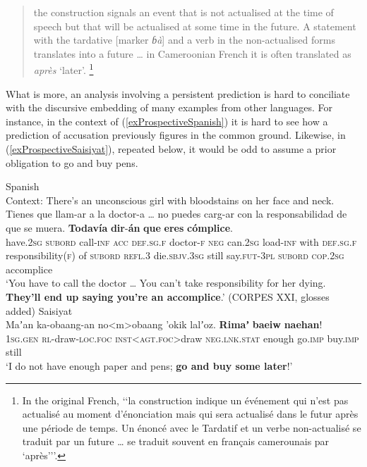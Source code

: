 \begin{quote}
the construction signals an event that is not actualised at the time of speech but that will be actualised at some time in the future. A statement with the tardative {[}marker \textit{ɓà}{]} and a verb in the non-actualised forms translates into a future … in Cameroonian French it is often translated as \textit{après} \lq later\rq{}. \parencite[382]{Elders2000}\footnote{In the original French, \lq\lq{}la construction indique un événement qui n’est pas actualisé au moment d’énonciation mais qui sera actualisé dans le futur après une période de temps. Un énoncé avec le Tardatif et un verbe non-actualisé se traduit par un future … se traduit souvent en français camerounais par \lq{}après\rq{}{\rq\rq}.}
\end{quote}

What is more, an analysis involving a persistent prediction is hard to conciliate with the discursive embedding of many examples from other languages. For instance, in the context of (\ref{exProspectiveSpanish}) it is hard to see how a prediction of accusation previously figures in the common ground. Likewise, in (\ref{exProspectiveSaisiyat}), repeated below, it would be odd to assume a prior obligation to go and buy pens.

\begin{exe}
	\ex Spanish\label{exProspectiveSpanish}\\
	 Context: There's an unconscious girl with bloodstains on her face and neck.\\
	 \gll Tienes que llam-ar a la doctor-a … no puedes carg-ar con la responsabilidad de que se muera. \textbf{Todavía} \textbf{dir}-\textbf{án} \textbf{que} \textbf{eres} \textbf{cómplice}.\\
	have.2\textsc{sg} \textsc{subord} call-\textsc{inf} \textsc{acc} \textsc{def}.\textsc{sg}.\textsc{f} doctor-\textsc{f} {}
	\textsc{neg} can.2\textsc{sg} load-\textsc{inf} with \textsc{def}.\textsc{sg}.\textsc{f} responsibility(\textsc{f}) of \textsc{subord} \textsc{refl}.3 die.\textsc{sbjv}.3\textsc{sg} still say.\textsc{fut}-3\textsc{pl} \textsc{subord} \textsc{cop}.2\textsc{sg} accomplice\\
	\glt \lq You have to call the doctor … You can't take responsibility for her dying. \textbf{They'll end up saying you're an accomplice}.\rq{ }(CORPES XXI, glosses added)
	 Saisiyat\\
	\gll Maʼan ka-obaang-an no<m>obaang \rq{}okik lalʼoz. \textbf{Rimaʼ} \textbf{baeiw} \textbf{naehan}!\\
	1\textsc{sg}.\textsc{gen} \textsc{rl}-draw-\textsc{loc}.\textsc{foc} \textsc{inst}<\textsc{agt}.\textsc{foc}>draw \textsc{neg}.\textsc{lnk}.\textsc{stat} enough go.\textsc{imp} buy.\textsc{imp} still\\
	\glt \lq I do not have enough paper and pens; \textbf{go and buy some later}!\rq
	\\\parencite[506]{ZeitounEtal2015}
\end{exe}

